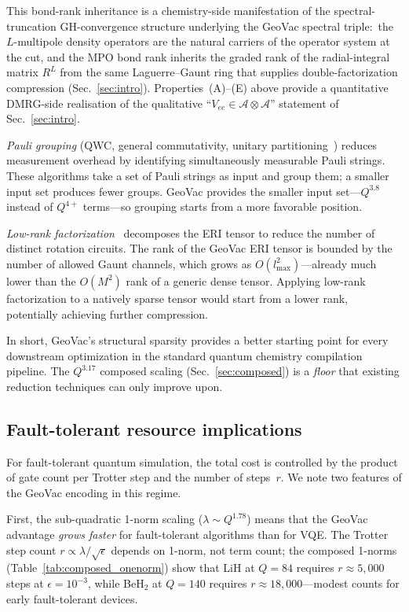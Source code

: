 \documentclass[aps,pra,twocolumn,superscriptaddress,longbibliography]{revtex4-2}
\begin{document}
This bond-rank inheritance is a chemistry-side manifestation of the
spectral-truncation GH-convergence structure underlying the GeoVac
spectral triple:\ the $L$-multipole density operators are the natural
carriers of the operator system at the cut, and the MPO bond rank
inherits the graded rank of the radial-integral matrix $R^L$ from the
same Laguerre--Gaunt ring that supplies double-factorization
compression (Sec.~\ref{sec:intro}).  Properties~(A)--(E) above provide
a quantitative DMRG-side realisation of the qualitative ``$V_{ee} \in
\mathcal{A}\otimes \mathcal{A}$'' statement of Sec.~\ref{sec:intro}.

\emph{Pauli grouping} (QWC, general commutativity, unitary
partitioning~\cite{verteletskyi2020,yen2020}) reduces measurement
overhead by identifying simultaneously measurable Pauli strings.
These algorithms take a set of Pauli strings as input and group them;
a smaller input set produces fewer groups.  GeoVac provides the
smaller input set---$Q^{3.8}$ instead of $Q^{4+}$ terms---so
grouping starts from a more favorable position.

\emph{Low-rank factorization}~\cite{motta2021,lee2021} decomposes the
ERI tensor to reduce the number of distinct rotation circuits.  The
rank of the GeoVac ERI tensor is bounded by the number of allowed
Gaunt channels, which grows as $O(l_{\max}^2)$---already much lower
than the $O(M^2)$ rank of a generic dense tensor.  Applying low-rank
factorization to a natively sparse tensor would start from a lower
rank, potentially achieving further compression.

In short, GeoVac's structural sparsity provides a better starting
point for every downstream optimization in the standard quantum
chemistry compilation pipeline.  The $Q^{3.17}$ composed scaling
(Sec.~\ref{sec:composed}) is a \emph{floor} that existing reduction
techniques can only improve upon.

\subsection{Fault-tolerant resource implications}
\label{sec:ft_resources}

For fault-tolerant quantum simulation, the total cost is controlled
by the product of gate count per Trotter step and the number of
steps~$r$.  We note two features of the GeoVac
encoding in this regime.

First, the sub-quadratic 1-norm scaling ($\lambda \sim Q^{1.78}$)
means that the GeoVac advantage \emph{grows faster} for fault-tolerant
algorithms than for VQE.  The Trotter step count
$r \propto \lambda / \sqrt{\epsilon}$ depends on 1-norm, not term
count; the composed 1-norms (Table~\ref{tab:composed_onenorm}) show
that LiH at $Q = 84$ requires $r \approx 5{,}000$ steps at
$\epsilon = 10^{-3}$, while BeH$_2$ at $Q = 140$ requires
$r \approx 18{,}000$---modest counts for early fault-tolerant devices.
\end{document}

